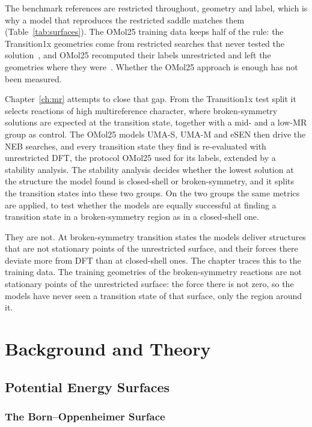 The benchmark references are restricted throughout, geometry and label,
which is why a model that reproduces the restricted saddle matches them
(Table~\ref{tab:surfaces}).
The OMol25 training data keeps half of the rule: the Transition1x
geometries come from restricted searches that never tested the
solution~\cite{schreiner2022}, and OMol25 recomputed their labels
unrestricted and left the geometries where they were~\cite{omol25}.
Whether the OMol25 approach is enough has not been measured.

Chapter~\ref{ch:mr} attempts to close that gap. From the Transition1x
test split it selects reactions of high multireference character,
where broken-symmetry solutions are expected at the transition state,
together with a mid- and a low-MR group as control. The OMol25 models
UMA-S, UMA-M and eSEN then drive the NEB searches, and every transition
state they find is re-evaluated with unrestricted DFT, the protocol
OMol25 used for its labels, extended by a stability analysis. The
stability analysis decides whether the lowest solution at the structure
the model found is closed-shell or broken-symmetry, and it splits the
transition states into these two groups. On the two groups the same
metrics are applied, to test whether the models are equally successful
at finding a transition state in a broken-symmetry region as in a
closed-shell one.

They are not. At broken-symmetry transition states the models deliver
structures that are not stationary points of the unrestricted surface,
and their forces there deviate more from DFT than at closed-shell ones.
The chapter traces this to the training data. The training geometries of the broken-symmetry reactions are not
stationary points of the unrestricted surface: the force there is
not zero, so the models have never seen a transition state of that
surface, only the region around it.

\newpage
\chapter{Background and Theory}

\section{Potential Energy Surfaces}
\label{sec:background-pes}

\subsection{The Born--Oppenheimer Surface}
\label{sec:background-bo}


